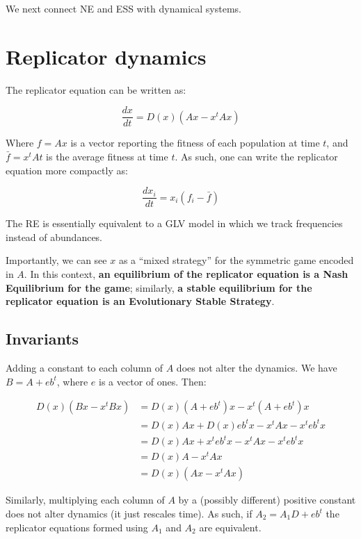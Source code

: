 \documentclass[]{book}
\begin{document}
We next connect NE and ESS with dynamical systems.

\hypertarget{replicator-dynamics}{%
\section{Replicator dynamics}\label{replicator-dynamics}}

The replicator equation can be written as:

\[
\dfrac{d x}{dt} = D(x)(A x - x^t A x)
\]

Where \(f = A x\) is a vector reporting the fitness of each population at time \(t\), and \(\bar{f} = x^t A t\) is the average fitness at time \(t\). As such, one can write the replicator equation more compactly as:

\[
\dfrac{d x_i}{dt} = x_i (f_i - \bar{f})
\]

The RE is essentially equivalent to a GLV model in which we track frequencies instead of abundances.

Importantly, we can see \(x\) as a ``mixed strategy'' for the symmetric game encoded in \(A\). In this context, \textbf{an equilibrium of the replicator equation is a Nash Equilibrium for the game}; similarly, \textbf{a stable equilibrium for the replicator equation is an Evolutionary Stable Strategy}.

\hypertarget{invariants}{%
\subsection{Invariants}\label{invariants}}

Adding a constant to each column of \(A\) does not alter the dynamics. We have \(B = A + e b^t\), where \(e\) is a vector of ones. Then:

\[
\begin{aligned}
D(x)(B x - x^t B x) &= D(x)(A + eb^t) x - x^t (A + eb^t) x\\
&= D(x)A x + D(x) eb^t x - x^t A x - x^t e b^t x\\
&= D(x)A x + x^t e b^t x - x^t A x - x^t e b^t  x\\
&= D(x)A - x^t A x\\
&= D(x)(A x - x^t A x)
\end{aligned}
\]

Similarly, multiplying each column of \(A\) by a (possibly different) positive constant does not alter dynamics (it just rescales time). As such, if \(A_2 = A_1 D + eb^t\) the replicator equations formed using \(A_1\) and \(A_2\) are equivalent.
\end{document}
